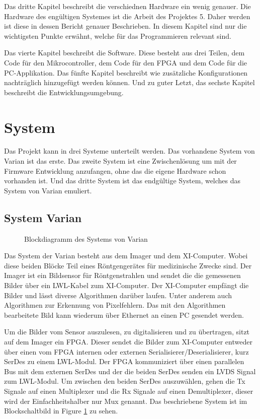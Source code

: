 \documentclass{article}
\begin{document}
Das dritte Kapitel beschreibt die verschiednen Hardware ein wenig genauer. Die Hardware des engültigen Systemes ist die Arbeit des Projektes 5. Daher werden ist diese in dessen Bericht genauer Beschrieben. In diesem Kapitel sind nur die wichtigsten Punkte erwähnt, welche für das Programmieren relevant sind.

Das vierte Kapitel beschreibt die Software. Diese besteht aus drei Teilen, dem Code für den Mikrocontroller, dem Code für den FPGA und dem Code für die PC-Applikation.
Das fünfte Kapitel beschreibt wie zusätzliche Konfigurationen nachträglich hinzugefügt werden können.
Und zu guter Letzt, das sechste Kapitel beschreibt die Entwicklungsumgebung.

\section{System}
Das Projekt kann in drei Systeme unterteilt werden. Das vorhandene System von Varian ist das erste. Das zweite System ist eine Zwischenlösung um mit der Firmware Entwicklung anzufangen, ohne das die eigene Hardware schon vorhanden ist. Und das dritte System ist das endgültige System, welches das System von Varian emuliert.

\subsection{System Varian}
\begin{figure}[tb]
    \caption{Blockdiagramm des Systems von Varian}
    \label{fig:bd_varian}
\end{figure}

Das System der Varian besteht aus dem Imager und dem XI-Computer. Wobei diese beiden Blöcke Teil eines Röntgengerätes für medizinische Zwecke sind. Der Imager ist ein Bildsensor für Röntgenstrahlen und sendet die die gemessenen Bilder über ein LWL-Kabel zum XI-Computer. Der XI-Computer empfängt die Bilder und lässt diverse Algorithmen darüber laufen. Unter anderem auch Algorithmen zur Erkennung von Pixelfehlern. Das mit den Algorithmen bearbeitete Bild kann wiederum über Ethernet an einen PC gesendet werden.

Um die Bilder vom Sensor auszulesen, zu digitalisieren und zu übertragen, sitzt auf dem Imager ein FPGA. Dieser sendet die Bilder zum XI-Computer entweder über einen vom FPGA internen oder externen Serialisierer/Deserialisierer, kurz SerDes zu einem LWL-Modul. Der FPGA kommuniziert über einen parallelen Bus mit dem externen SerDes und der die beiden SerDes senden ein LVDS Signal zum LWL-Modul. Um zwischen den beiden SerDes auszuwählen, gehen die Tx Signale auf einen Multiplexer und die Rx Signale auf einen Demultiplexer, dieser wird der Einfachheitshalber nur Mux genannt. Das beschriebene System ist im Blockschaltbild in Figure \ref{fig:bd_varian} zu sehen.
\end{document}
